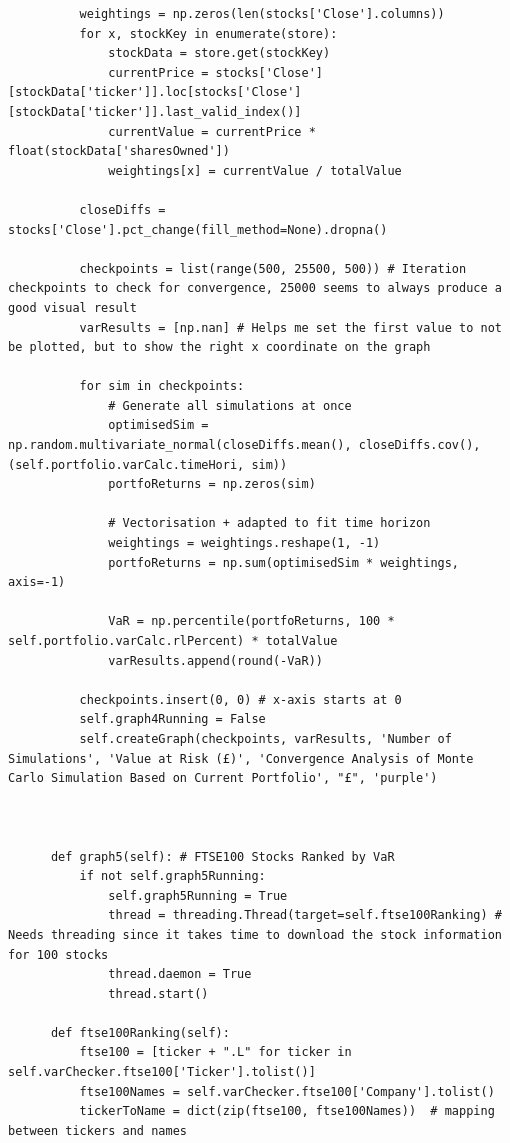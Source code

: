 \documentclass{article}
\begin{document}
\begin{verbatim}
          weightings = np.zeros(len(stocks['Close'].columns))
          for x, stockKey in enumerate(store):
              stockData = store.get(stockKey)
              currentPrice = stocks['Close'][stockData['ticker']].loc[stocks['Close'][stockData['ticker']].last_valid_index()]
              currentValue = currentPrice * float(stockData['sharesOwned'])
              weightings[x] = currentValue / totalValue

          closeDiffs = stocks['Close'].pct_change(fill_method=None).dropna()
          
          checkpoints = list(range(500, 25500, 500)) # Iteration checkpoints to check for convergence, 25000 seems to always produce a good visual result
          varResults = [np.nan] # Helps me set the first value to not be plotted, but to show the right x coordinate on the graph

          for sim in checkpoints:
              # Generate all simulations at once
              optimisedSim = np.random.multivariate_normal(closeDiffs.mean(), closeDiffs.cov(), (self.portfolio.varCalc.timeHori, sim))
              portfoReturns = np.zeros(sim)

              # Vectorisation + adapted to fit time horizon
              weightings = weightings.reshape(1, -1)
              portfoReturns = np.sum(optimisedSim * weightings, axis=-1)

              VaR = np.percentile(portfoReturns, 100 * self.portfolio.varCalc.rlPercent) * totalValue
              varResults.append(round(-VaR))
          
          checkpoints.insert(0, 0) # x-axis starts at 0
          self.graph4Running = False
          self.createGraph(checkpoints, varResults, 'Number of Simulations', 'Value at Risk (£)', 'Convergence Analysis of Monte Carlo Simulation Based on Current Portfolio', "£", 'purple')



      def graph5(self): # FTSE100 Stocks Ranked by VaR
          if not self.graph5Running:
              self.graph5Running = True
              thread = threading.Thread(target=self.ftse100Ranking) # Needs threading since it takes time to download the stock information for 100 stocks
              thread.daemon = True
              thread.start()
      
      def ftse100Ranking(self):
          ftse100 = [ticker + ".L" for ticker in self.varChecker.ftse100['Ticker'].tolist()]
          ftse100Names = self.varChecker.ftse100['Company'].tolist()
          tickerToName = dict(zip(ftse100, ftse100Names))  # mapping between tickers and names
      

\end{verbatim}
\end{document}
